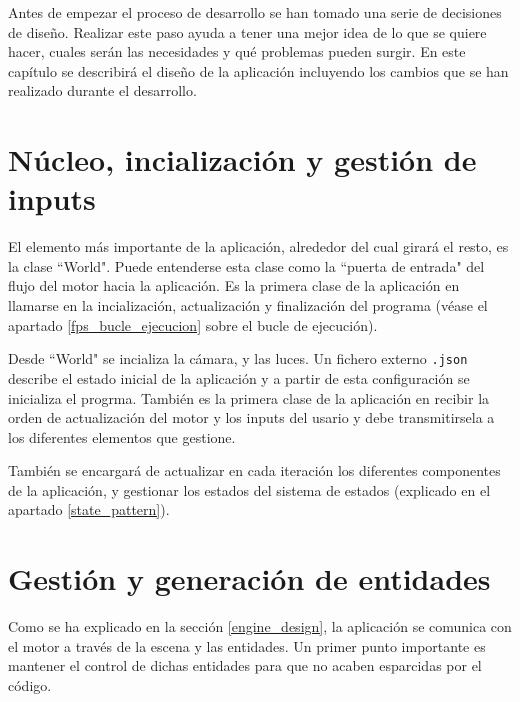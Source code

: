 \label{app_design}
Antes de empezar el proceso de desarrollo se han tomado una serie de decisiones de diseño. Realizar este paso ayuda a tener una mejor idea de lo que se quiere hacer, cuales serán las necesidades y qué problemas pueden surgir. En este capítulo se describirá el diseño de la aplicación incluyendo los cambios que se han realizado durante el desarrollo.

\section{Núcleo, incialización y gestión de inputs}
\label{world}
El elemento más importante de la aplicación, alrededor del cual girará el resto, es la clase ``World". Puede entenderse esta clase como la ``puerta de entrada" del flujo del motor hacia la aplicación. Es la primera clase de la aplicación en llamarse en la incialización, actualización y finalización del programa (véase el apartado \ref{fps_bucle_ejecucion} sobre el bucle de ejecución).

Desde ``World" se incializa la cámara, y las luces. Un fichero externo \texttt{.json} describe el estado inicial de la aplicación y a partir de esta configuración se inicializa el progrma. También es la primera clase de la aplicación en recibir la orden de actualización del motor y los inputs del usario y debe transmitirsela a los diferentes elementos que gestione.

También se encargará de actualizar en cada iteración los diferentes componentes de la aplicación, y gestionar los estados del sistema de estados (explicado en el apartado \ref{state_pattern}).


\section{Gestión y generación de entidades}
\label{managers}
Como se ha explicado en la sección \ref{engine_design}, la aplicación se comunica con el motor a través de la escena y las entidades. Un primer punto importante es mantener el control de dichas entidades para que no acaben esparcidas por el código.

